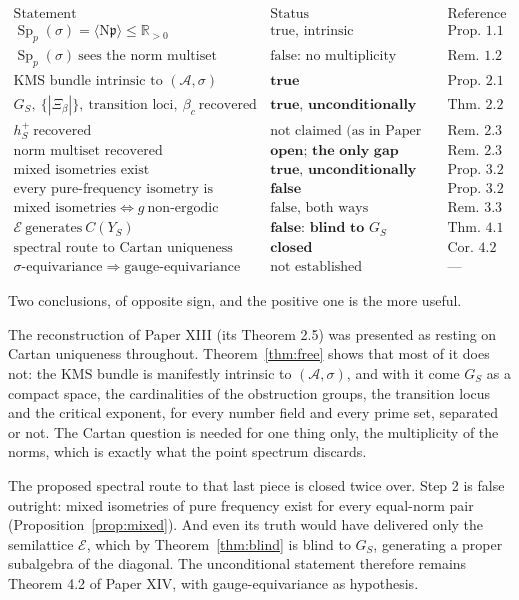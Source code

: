 \documentclass[11pt]{amsart}
\numberwithin{equation}{section}
\theoremstyle{definition}
\theoremstyle{remark}
\newcommand{\R}{\mathbb{R}}
\newcommand{\cA}{\mathcal{A}}
\newcommand{\cE}{\mathcal{E}}
\newcommand{\pp}{\mathfrak{p}}
\newcommand{\Ns}{\mathrm{N}}
\newcommand{\Sp}{\operatorname{Sp}}
\begin{document}
\[
\begin{array}{lll}
\text{Statement} & \text{Status} & \text{Reference}\\\hline
\Sp_p(\sigma)=\langle\Ns\pp\rangle\le\R_{>0} & \text{true, intrinsic} & \text{Prop.~1.1}\\
\Sp_p(\sigma)\ \text{sees the norm multiset} & \text{false: no multiplicity} & \text{Rem.~1.2}\\
\text{KMS bundle intrinsic to }(\cA,\sigma) & \textbf{true} & \text{Prop.~2.1}\\
G_S,\ \{|\Xi_\beta|\},\ \text{transition loci},\ \beta_c\ \text{recovered} & \textbf{true, unconditionally} & \text{Thm.~2.2}\\
h^+_S\ \text{recovered} & \text{not claimed (as in Paper XIII)} & \text{Rem.~2.3}\\
\text{norm multiset recovered} & \textbf{open; the only gap} & \text{Rem.~2.3}\\
\text{mixed isometries exist} & \textbf{true, unconditionally} & \text{Prop.~3.2}\\
\text{every pure-frequency isometry is diagonal} & \textbf{false} & \text{Prop.~3.2}\\
\text{mixed isometries}\iff g\ \text{non-ergodic} & \text{false, both ways} & \text{Rem.~3.3}\\
\cE\ \text{generates}\ C(Y_S) & \textbf{false: blind to }G_S & \text{Thm.~4.1}\\
\text{spectral route to Cartan uniqueness} & \textbf{closed} & \text{Cor.~4.2}\\
\sigma\text{-equivariance}\Rightarrow\text{gauge-equivariance} & \text{not established} & \text{---}
\end{array}
\]

Two conclusions, of opposite sign, and the positive one is the more useful.

The reconstruction of Paper XIII (its Theorem 2.5) was presented as resting on Cartan
uniqueness throughout. Theorem~\ref{thm:free} shows that most of it does not: the
$\mathrm{KMS}$ bundle is manifestly intrinsic to $(\cA,\sigma)$, and with it come $G_S$ as a
compact space, the cardinalities of the obstruction groups, the transition locus and the
critical exponent, for every number field and every prime set, separated or not. The Cartan
question is needed for one thing only, the multiplicity of the norms, which is exactly what
the point spectrum discards.

The proposed spectral route to that last piece is closed twice over. Step 2 is false
outright: mixed isometries of pure frequency exist for every equal-norm pair
(Proposition~\ref{prop:mixed}). And even its truth would have delivered only the semilattice
$\cE$, which by Theorem~\ref{thm:blind} is blind to $G_S$, generating a proper subalgebra of
the diagonal. The unconditional statement therefore remains Theorem 4.2 of Paper XIV, with
gauge-equivariance as hypothesis.
\end{document}

